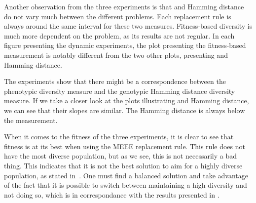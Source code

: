 Another observation from the three experiments is that \dia{} and Hamming distance do not vary much between the different problems. Each replacement rule is always around the same interval for these two measures. Fitness-based diversity is much more dependent on the problem, as its results are not regular. In each figure presenting the dynamic experiments, the plot presenting the fitness-based measurement is notably different from the two other plots, presenting \dia{} and Hamming distance.

The experiments show that there might be a correspondence between the phenotypic \dia{} diversity measure and the genotypic Hamming distance diversity measure. If we take a closer look at the plots illustrating \dia{} and Hamming distance, we can see that their slopes are similar. The Hamming distance is always below the \dia{} measurement.%

When it comes to the fitness of the three experiments, it is clear to see that fitness is at its best when using the MEEE replacement rule. This rule does not have the most diverse population, but as we see, this is not necessarily a bad thing. This indicates that it is not the best solution to aim for a highly diverse population, as stated in~\cite{Darwen00doesextra}. One must find a balanced solution and take advantage of the fact that it is possible to switch between maintaining a high diversity and not doing so, which is in correspondance with the results presented in \cite{Darwen00doesextra}.
